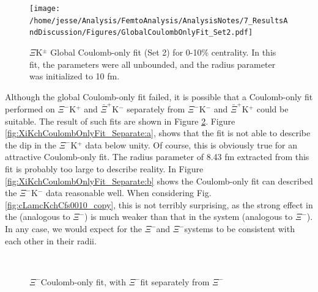 \documentclass[/home/jesse/Analysis/FemtoAnalysis/AnalysisNotes/AnalysisNoteJBuxton.tex]{subfiles}
\begin{document}
\begin{figure}[h]
  \centering
  \texttt{[image: /home/jesse/Analysis/FemtoAnalysis/AnalysisNotes/7\_ResultsAndDiscussion/Figures/GlobalCoulombOnlyFit\_Set2.pdf]}
  \caption[$\Xi$K$^{\pm}$ global Coulomb-only fit (Set 2)]{$\Xi$K$^{\pm}$ Global Coulomb-only fit (Set 2) for 0-10\% centrality.  In this fit, the parameters were all unbounded, and the radius parameter was initialized to 10 fm.}
  \label{fig:XiKchGlobalCoulombOnlySet2}
\end{figure}

Although the global Coulomb-only fit failed, it is possible that a Coulomb-only fit performed on $\Xi^{-}$K$^{+}$ and $\bar{\Xi}^{+}$K$^{-}$ separately from $\Xi^{-}$K$^{-}$ and $\bar{\Xi}^{+}$K$^{+}$ could be suitable.  
The result of such fits are shown in Figure \ref{fig:XiKchCoulombOnlyFit_Separate}.  
Figure \ref{fig:XiKchCoulombOnlyFit_Separate:a}, shows that the fit is not able to describe the dip in the $\Xi^{-}$K$^{+}$ data below unity. 
Of course, this is obviously true for an attractive Coulomb-only fit.  
The radius parameter of 8.43 fm extracted from this fit is probably too large to describe reality.  
In Figure \ref{fig:XiKchCoulombOnlyFit_Separate:b} shows the Coulomb-only fit can described the $\Xi^{-}$K$^{-}$ data reasonable well.
When considering Fig. \ref{fig:cLamcKchCfs0010_copy}, this is not terribly surprising, as the strong effect in the \LamKchM (analogous to $\Xi^{-}$\KchM) is much weaker than that in the \LamKchP system (analogous to $\Xi^{-}$\KchP).
In any case, we would expect for the $\Xi^{-}$\KchP and $\Xi^{-}$\KchM systems to be consistent with each other in their radii.


\begin{figure}[h]
  \centering
  \\
  \caption[$\Xi^{-}$\Kpm Coulomb-only fit: $\Xi^{-}$\KchP separate from $\Xi^{-}$\KchM]
  {
  $\Xi^{-}$\Kpm Coulomb-only fit, with $\Xi^{-}$\KchP fit separately from $\Xi^{-}$\KchM
  }
  \label{fig:XiKchCoulombOnlyFit_Separate}
\end{figure}

\clearpage
\end{document}
